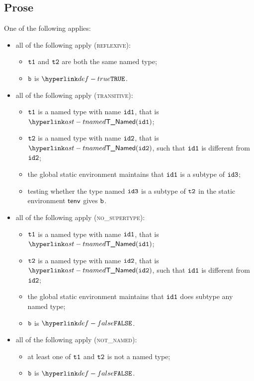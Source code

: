 \subsection{Prose}
One of the following applies:
\begin{itemize}
  \item all of the following apply (\textsc{reflexive}):
  \begin{itemize}
    \item $\texttt{t1}$ and $\texttt{t2}$ are both the same named type;
    \item $\texttt{b}$ is $\True$.
  \end{itemize}

  \item all of the following apply (\textsc{transitive}):
  \begin{itemize}
    \item $\texttt{t1}$ is a named type with name $\texttt{id1}$, that is $\TNamed(\idone)$;
    \item $\texttt{t2}$ is a named type with name $\texttt{id2}$, that is $\TNamed(\idtwo)$, such that $\texttt{id1}$ is different from $\texttt{id2}$;
    \item the global static environment maintains that $\texttt{id1}$ is a subtype of $\texttt{id3}$;
    \item testing whether the type named $\texttt{id3}$ is a subtype of $\texttt{t2}$ in the static environment $\textsf{tenv}$
    gives $\texttt{b}$.
  \end{itemize}

  \item all of the following apply (\textsc{no\_supertype}):
  \begin{itemize}
    \item $\texttt{t1}$ is a named type with name $\texttt{id1}$, that is $\TNamed(\idone)$;
    \item $\texttt{t2}$ is a named type with name $\texttt{id2}$, that is $\TNamed(\idtwo)$, such that $\texttt{id1}$ is different from $\texttt{id2}$;
    \item the global static environment maintains that $\texttt{id1}$ does subtype any named type;
    \item $\texttt{b}$ is $\False$.
  \end{itemize}

  \item all of the following apply (\textsc{not\_named}):
  \begin{itemize}
    \item at least one of $\texttt{t1}$ and $\texttt{t2}$ is not a named type;
    \item $\texttt{b}$ is $\False$.
  \end{itemize}
\end{itemize}
